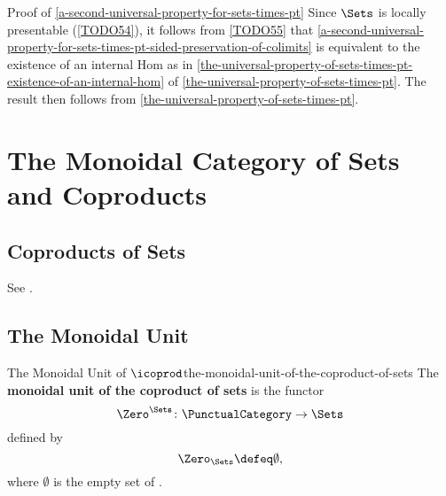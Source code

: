 \begin{Proof}{Proof of \cref{a-second-universal-property-for-sets-times-pt}}%
    Since $\Sets$ is locally presentable (\cref{TODO54}), it follows from \cref{TODO55} that \cref{a-second-universal-property-for-sets-times-pt-sided-preservation-of-colimits} is equivalent to the existence of an internal Hom as in \cref{the-universal-property-of-sets-times-pt-existence-of-an-internal-hom} of \cref{the-universal-property-of-sets-times-pt}. The result then follows from \cref{the-universal-property-of-sets-times-pt}.
\end{Proof}
\section{The Monoidal Category of Sets and Coproducts}\label{section-the-monoidal-category-of-sets-and-coproducts}
\subsection{Coproducts of Sets}\label{subsection-the-monoidal-category-of-sets-and-coproducts-coproducts-of-sets}
See .
\subsection{The Monoidal Unit}\label{subsection-the-monoidal-category-of-sets-and-coproducts-the-monoidal-unit-of-the-coproduct-of-sets}
\begin{definition}{The Monoidal Unit of $\icoprod$}{the-monoidal-unit-of-the-coproduct-of-sets}%
    The \textbf{monoidal unit of the coproduct of sets} is the functor
    \[
        \Zero^{\Sets}
        \colon
        \PunctualCategory
        \to
        \Sets
    \]
    defined by
    \[
        \Zero_{\Sets}%
        \defeq%
        \emptyset,
    \]%
    where $\emptyset$ is the empty set of .
\end{definition}
